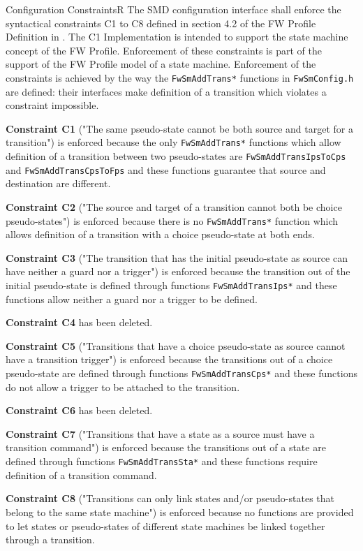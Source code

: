 \documentclass[a4paper,10pt]{article}
\newenvironment{fw_req}[6]
{\addtocounter{subsubsection}{1}
	\hspace{0.2cm}\textbf{FW-\arabic{section}.\arabic{subsection}.\arabic{subsubsection}/#2
	\hspace{0.8cm} #1}
	\vspace{-10pt}
\begin{longtable}{p{2.7cm}P{8.5cm}}
\hline
\textsc{Requirement} & #3 \\
\textsc{Justification} & #4 \\
\textsc{Implementation} & #5  \\ 
\textsc{Verification} & #6  \\
\hline
}
{\end{longtable}}
\begin{document}
\begin{fw_req}{Configuration Constraints}{R}
{The SMD configuration interface shall enforce the syntactical 
constraints C1 to C8 defined in section 4.2 of 
the FW Profile Definition in \cite{ref:fwprofile}.}
{The C1 Implementation is intended to support the state machine 
concept of the FW Profile. Enforcement of these 
constraints is part of the support of the FW Profile model of a  state machine.}
{ Enforcement of the constraints is achieved by the way 
the \texttt{FwSmAddTrans*} functions in 
\texttt{FwSmConfig.h} are defined: their interfaces make definition of a transition 
which violates a constraint impossible.} 
{\textbf{Constraint C1} ("The same pseudo-state cannot be both source and target for
 a transition") is enforced because the only 
\texttt{FwSmAddTrans*} functions which allow definition of a transition between two 
pseudo-states are \texttt{FwSmAddTransIpsToCps} 
and \texttt{FwSmAddTransCpsToFps} and these functions guarantee that source and destination 
are different.
\par
\textbf{Constraint C2} ("The source and target of a transition cannot both be choice 
pseudo-states") is enforced because there is no 
\texttt{FwSmAddTrans*} function which allows definition of a transition with a choice 
pseudo-state at both ends.
\par
\textbf{Constraint C3} ("The transition that has the initial pseudo-state as source 
can have neither a guard nor a trigger") is enforced 
because the transition out of the initial pseudo-state is defined through functions 
\texttt{FwSmAddTransIps*} and these functions allow neither a guard nor a trigger to be defined.
\par
\textbf{Constraint C4} has been deleted.
\par
\textbf{Constraint C5} ("Transitions that have a choice pseudo-state as source cannot have 
a transition trigger") is enforced because the 
transitions out of a choice pseudo-state are defined through functions 
\texttt{FwSmAddTransCps*} and these functions do not allow a trigger 
to be attached to the transition.
\par 
\textbf{Constraint C6} has been deleted.
\par
\textbf{Constraint C7} ("Transitions that have a state as a source must have a 
transition command") is enforced because the transitions out of 
a state are defined through functions \texttt{FwSmAddTransSta*} and these functions 
require definition of a transition command.
\par 
\textbf{Constraint C8} ("Transitions can only link states and/or pseudo-states that 
belong to the same state machine") is enforced because no 
functions are provided to let states or pseudo-states of different state machines be 
linked together through a transition.}
\end{fw_req}
\end{document}
